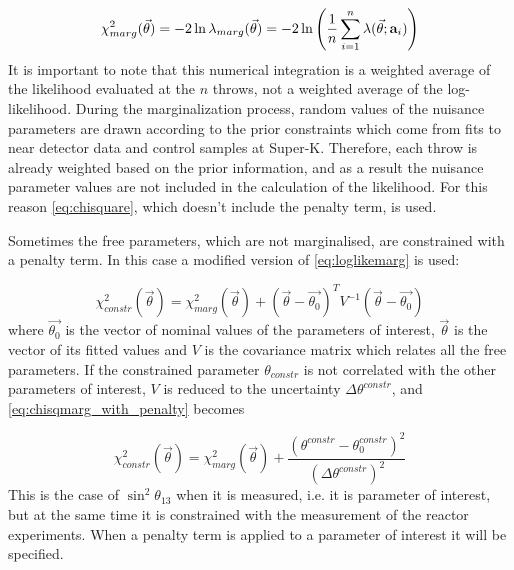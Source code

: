 \begin{equation} \label{eq:loglikemarg}
\chi^2_{marg} (\vec{\theta}) = - 2  \ln \lambda_{marg} (\vec{\theta})  = -2 \ln \left(\frac{1}{n} \sum_{i=1}^{n} 
\lambda (\vec{\theta}; {\bf a}_i)  \right) 
\end{equation}
It is important to note that this numerical integration is a weighted average of the likelihood evaluated at the $n$ throws, 
not a weighted average of the log-likelihood.
During the marginalization process, random values of the nuisance parameters are drawn according to the prior constraints which come from fits to near detector data and control samples at Super-K. Therefore, each throw is already weighted based on the prior information, and as a result the nuisance parameter values are not included in the calculation of the likelihood.
%
%
For this reason \cref{eq:chisquare}, which doesn't include the penalty term, is used.

Sometimes the free parameters, which are not marginalised, 
are constrained with a penalty term.
In this case a modified version of \cref{eq:loglikemarg} is used:

\begin{equation} \label{eq:chisqmarg_with_penalty}
\chi^2_{constr} (\vec{\theta}) = \chi^2_{marg}(\vec{\theta}) + (\vec{\theta} - \vec{\theta_0})^T V^{-1} (\vec{\theta} - \vec{\theta_0}) 
\end{equation}
where $\vec{\theta_0}$ is the vector of nominal values of the parameters of interest,
$\vec{\theta}$ is the vector of its fitted values 
and $V$ is the covariance matrix which relates all the free parameters.
If the constrained parameter $\theta_{constr}$ is not correlated with the other parameters of interest,
$V$ is reduced to the uncertainty $\Delta \theta^{constr}$,
and \cref{eq:chisqmarg_with_penalty} becomes

\begin{equation} \label{eq:chisqmarg_with_penalty_uncorr}
\chi^2_{constr} (\vec{\theta}) = \chi^2_{marg}(\vec{\theta}) + \frac{ (\theta^{constr} - \theta^{constr}_0)^2 }{(\Delta \theta^{constr})^2}
\end{equation}
This is the case of $\sin^2 \theta_{13}$ when it is measured, i.e. it is parameter of interest,
but at the same time it is constrained with the measurement of the reactor experiments.
When a penalty term is applied to a parameter of interest it will be specified.


